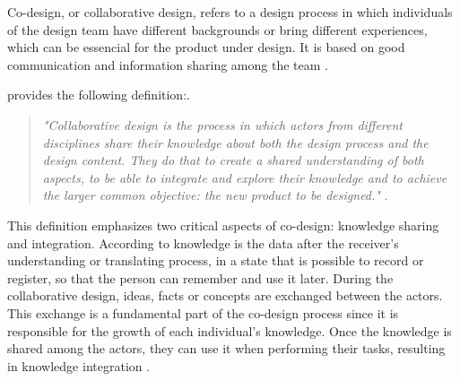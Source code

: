 Co-design, or collaborative design, refers to a design process in which individuals of the design team have different backgrounds or bring different experiences, which can be essencial for the product under design. It is based on good communication and information sharing among the team \cite{chiu2002organizational}.

 provides the following definition:.

\begin{quote}
    \textit{"Collaborative design is the process in which actors from different disciplines share their knowledge about both the design process and the design content. They do that to create a shared understanding of both aspects, to be able to integrate and explore their knowledge and to achieve the larger common objective: the new product to be designed."} \cite{kleinsmann2006understanding}.
\end{quote}

This definition emphasizes two critical aspects of co-design: knowledge sharing and integration. According to  knowledge is the data after the receiver's understanding or translating process, in a state that is possible to record or register, so that the person can remember and use it later. During the collaborative design, ideas, facts or concepts are exchanged between the actors. This exchange is a fundamental part of the co-design process since it is responsible for the growth of each individual's knowledge. Once the knowledge is shared among the actors, they can use it when performing their tasks, resulting in knowledge integration \cite{kleinsmann2006understanding}.